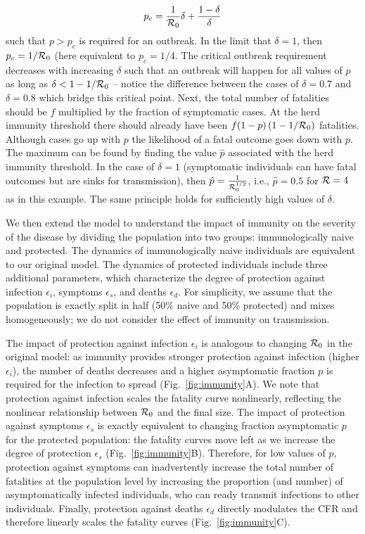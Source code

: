 \documentclass[12pt]{article}
\newcommand{\fref}[1]{Fig.~\ref{fig:#1}}
\begin{document}
\begin{equation}
    p_c = \frac{1}{{\cal{R}}_0}\delta+\frac{1-\delta}{\delta}
\end{equation}
such that $p>p_c$ is required for an outbreak. In the limit that $\delta=1$, then $p_c=1/{\cal{R}}_0$ (here equivalent
to $p_c=1/4$.  The critical outbreak requirement decreases with increasing $\delta$ such that an outbreak will happen
for all values of $p$ as long as $\delta<1-1/{\cal{R}}_0$ -- notice the difference between the cases 
of $\delta=0.7$ and $\delta=0.8$ which bridge this critical point.  Next, the total number of fatalities should be
$f$ multiplied by the fraction of symptomatic cases.  At the herd immunity threshold there should already
have been $f(1-p)\left(1-1/{\cal{R}}_0\right)$ fatalities.  Although cases go up with $p$ the likelihood of a fatal outcome goes down with $p$. The maximum can be found by finding the value $\hat{p}$ associated with the herd immunity threshold. In the case of $\delta=1$ (symptomatic individuals can have fatal outcomes but are sinks for transmission), then $\hat{p}=\frac{1}{{\cal{R}}_0^{1/2}}$, i.e., $\hat{p}=0.5$ for ${\cal{R}}=4$ as in this example.  The same
principle holds for sufficiently high values of $\delta$.

We then extend the model to understand the impact of immunity on the severity of the disease by dividing the population into two groups: immunologically naive and protected.
The dynamics of immunologically naive individuals are equivalent to our original model.
The dynamics of protected individuals include three additional parameters, which characterize the degree of protection against infection $\epsilon_i$, symptoms $\epsilon_s$, and deaths $\epsilon_d$.
For simplicity, we assume that the population is exactly split in half (50\% naive and 50\% protected) and mixes homogeneously; we do not consider the effect of immunity on transmission.

The impact of protection against infection $\epsilon_i$ is analogous to changing ${\cal{R}}_0$ in the original model: as immunity provides stronger protection against infection (higher $\epsilon_i$), the number of deaths decreases and a higher asymptomatic fraction $p$ is required for the infection to spread (\fref{immunity}A).
We note that protection against infection scales the fatality curve nonlinearly, reflecting the nonlinear relationship between ${\cal{R}}_0$ and the final size.
The impact of protection against symptoms $\epsilon_s$ is exactly equivalent to changing fraction asymptomatic $p$ for the protected population:
the fatality curves move left as we increase the degree of protection $\epsilon_s$ (\fref{immunity}B).
Therefore, for low values of $p$, protection against symptoms can inadvertently increase the total number of fatalities at the population level by increasing the proportion (and number) of asymptomatically infected individuals, who can ready transmit infections to other individuals. 
Finally, protection against deaths $\epsilon_d$ directly modulates the CFR and therefore linearly scales the fatality curves (\fref{immunity}C).
\end{document}
